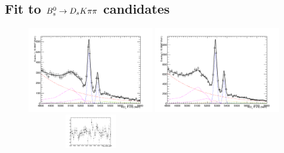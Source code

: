


\subsection{Fit to ${{B}^0_{s}}\rightarrow{\ensuremath{{D}_{s}}}{\ensuremath{K}}{\ensuremath{\pi}}{\ensuremath{\pi}}$ candidates}
\label{subsec: SigFit}

\begin{figure}[h]
\includegraphics[height=7.cm,width=0.49\textwidth]{figs/BmassFit_sim11.pdf}
\includegraphics[height=7.cm,width=0.49\textwidth]{figs/BmassFit_sim12.pdf}\\
\includegraphics[width=0.49\textwidth,height=1.5cm]{figs/pull_sim11.pdf}

\end{figure}
